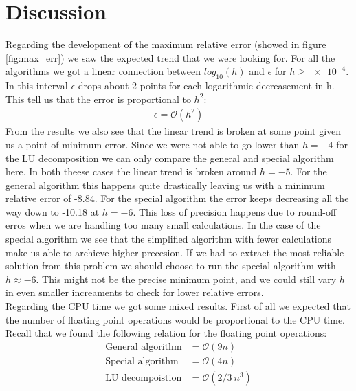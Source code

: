 \documentclass[american,a4paper,12pt]{article}
\begin{document}
\section{Discussion}
Regarding the development of the maximum relative error (showed in figure \ref{fig:max_err}) we saw the expected trend that we were looking for. For all the algorithms we got a linear connection between $log_{10}(h)$ and $\epsilon$ for $h \ge \num{e-4}$. In this interval $\epsilon$ drops about 2 points for each logarithmic decreasement in h. This tell us that the error is proportional to $h^2$:
\begin{align*}
  \epsilon = \mathcal{O}(h^2)
\end{align*}
From the results we also see that the linear trend is broken at some point given us a point of minimum error. Since we were not able to go lower than $h = \num{-4}$ for the LU decomposition we can only compare the general and special algorithm here. In both theese cases the linear trend is broken around $h = \num{-5}$. For the general algorithm this happens quite drastically leaving us with a minimum relative error of -8.84. For the special algorithm the error keeps decreasing all the way down to -10.18 at $h = \num{-6}$. This loss of precision happens due to round-off erros when we are handling too many small calculations. In the case of the special algorithm we see that the simplified algorithm with fewer calculations make us able to archieve higher precesion. If we had to extract the most reliable solution from this problem we should choose to run the special algorithm with $h \approx \num{-6}$. This might not be the precise minimum point, and we could still vary $h$ in even smaller increaments to check for lower relative errors. \\
Regarding the CPU time we got some mixed results. First of all we expected that the number of floating point operations would be proportional to the CPU time. Recall that we found the following relation for the floating point operations:
\begin{align*}
  \text{General algorithm} &= \mathcal{O}(9n) \\
  \text{Special algorithm} &= \mathcal{O}(4n) \\
  \text{LU decompoistion} &= \mathcal{O}(2/3\ n^3) \\
\end{align*}
\end{document}
